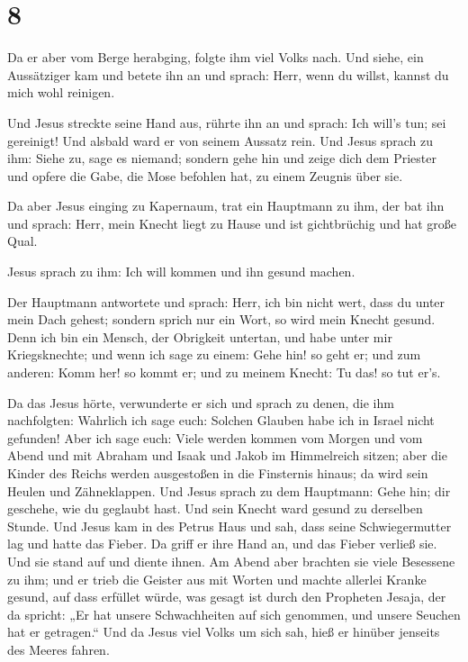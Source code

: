 \hypertarget{section-7}{%
\section{8}\label{section-7}}

 Da er aber vom Berge herabging, folgte ihm viel Volks
nach.  Und siehe, ein Aussätziger kam und betete ihn an
und sprach: Herr, wenn du willst, kannst du mich wohl reinigen.

 Und Jesus streckte seine Hand aus, rührte ihn an und
sprach: Ich will's tun; sei gereinigt! Und alsbald ward er von seinem
Aussatz rein.  Und Jesus sprach zu ihm: Siehe zu, sage es
niemand; sondern gehe hin und zeige dich dem Priester und opfere die
Gabe, die Mose befohlen hat, zu einem Zeugnis über sie.

 Da aber Jesus einging zu Kapernaum, trat ein Hauptmann zu
ihm, der bat ihn  und sprach: Herr, mein Knecht liegt zu
Hause und ist gichtbrüchig und hat große Qual.

 Jesus sprach zu ihm: Ich will kommen und ihn gesund
machen.

 Der Hauptmann antwortete und sprach: Herr, ich bin nicht
wert, dass du unter mein Dach gehest; sondern sprich nur ein Wort, so
wird mein Knecht gesund.  Denn ich bin ein Mensch, der
Obrigkeit untertan, und habe unter mir Kriegsknechte; und wenn ich sage
zu einem: Gehe hin! so geht er; und zum anderen: Komm her! so kommt er;
und zu meinem Knecht: Tu das! so tut er's.

 Da das Jesus hörte, verwunderte er sich und sprach zu
denen, die ihm nachfolgten: Wahrlich ich sage euch: Solchen Glauben habe
ich in Israel nicht gefunden!  Aber ich sage euch: Viele
werden kommen vom Morgen und vom Abend und mit Abraham und Isaak und
Jakob im Himmelreich sitzen;  aber die Kinder des Reichs
werden ausgestoßen in die Finsternis hinaus; da wird sein Heulen und
Zähneklappen.  Und Jesus sprach zu dem Hauptmann: Gehe
hin; dir geschehe, wie du geglaubt hast. Und sein Knecht ward gesund zu
derselben Stunde.  Und Jesus kam in des Petrus Haus und
sah, dass seine Schwiegermutter lag und hatte das Fieber.
 Da griff er ihre Hand an, und das Fieber verließ sie.
Und sie stand auf und diente ihnen.  Am Abend aber
brachten sie viele Besessene zu ihm; und er trieb die Geister aus mit
Worten und machte allerlei Kranke gesund,  auf dass
erfüllet würde, was gesagt ist durch den Propheten Jesaja, der da
spricht: „Er hat unsere Schwachheiten auf sich genommen, und unsere
Seuchen hat er getragen.``  Und da Jesus viel Volks um
sich sah, hieß er hinüber jenseits des Meeres fahren.

